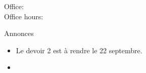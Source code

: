 \documentclass{beamer}
\subtitle[Traits et questions]{Encore les traits et les questions}
\begin{document}
  \begin{frame}
    \titlepage
    \tiny{Office: \\
          Office hours: }
  \end{frame}

  \begin{frame}{Annonces}
    \begin{itemize}
      \item Le devoir 2 est à rendre le 22 septembre.
      \item[] 
    \end{itemize}
  \end{frame}
  
\end{document}
